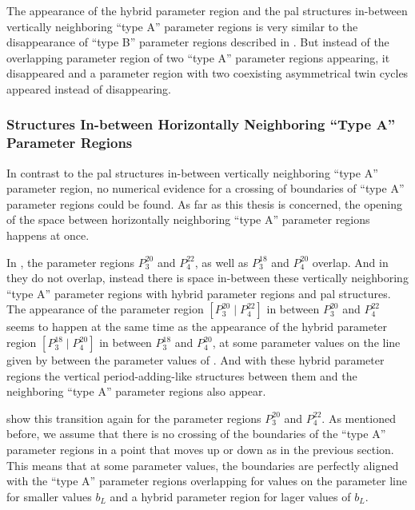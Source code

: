 The appearance of the hybrid parameter region and the \gls{pal} structures in-between vertically neighboring ``type A'' parameter regions is very similar to the disappearance of ``type B'' parameter regions described in .
But instead of the overlapping parameter region of two ``type A'' parameter regions appearing, it disappeared and a parameter region with two coexisting asymmetrical twin cycles appeared instead of disappearing.

\subsubsection{ Structures In-between Horizontally Neighboring ``Type A'' Parameter Regions}
\label{sec:add.change.appa.vert}

In contrast to the \gls{pal} structures in-between vertically neighboring ``type A'' parameter region, no numerical evidence for a crossing of boundaries of ``type A'' parameter regions could be found.
As far as this thesis is concerned, the opening of the space between horizontally neighboring ``type A'' parameter regions happens at once.

In , the parameter regions $P^{20}_3$ and $P^{22}_4$, as well as $P^{18}_3$ and $P^{20}_4$ overlap.
And in  they do not overlap, instead there is space in-between these vertically neighboring ``type A'' parameter regions with hybrid parameter regions and \gls{pal} structures.
The appearance of the parameter region $\left[P^{20}_3 \mid P^{22}_4\right]$ in between $P^{20}_3$ and $P^{22}_4$ seems to happen at the same time as the appearance of the hybrid parameter region $\left[P^{18}_3 \mid P^{20}_4\right]$ in between $P^{18}_3$ and $P^{20}_4$, at some parameter values on the line given by  between the parameter values of .
And with these hybrid parameter regions the vertical period-adding-like structures between them and the neighboring ``type A'' parameter regions also appear.

 show this transition again for the parameter regions $P^{20}_3$ and $P^{22}_4$.
As mentioned before, we assume that there is no crossing of the boundaries of the ``type A'' parameter regions in a point that moves up or down as in the previous section.
This means that at some parameter values, the boundaries are perfectly aligned with the ``type A'' parameter regions overlapping for values on the parameter line for smaller values $b_L$ and a hybrid parameter region for lager values of $b_L$.

